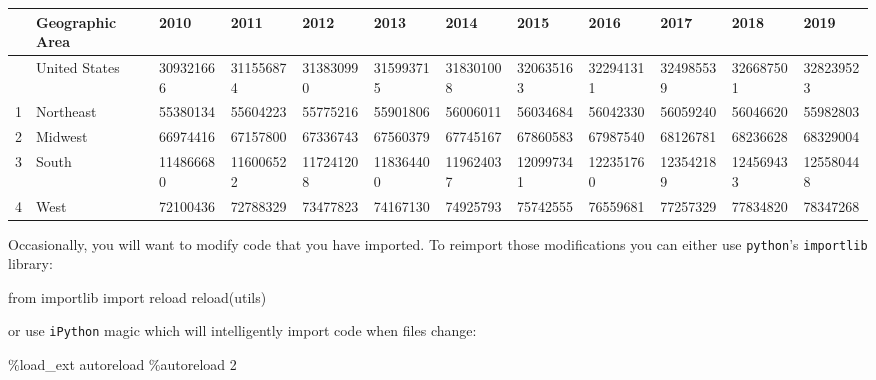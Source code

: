 \documentclass[
  letterpaper,
  DIV=11,
  numbers=noendperiod]{scrreprt}
\newenvironment{Shaded}{\begin{snugshade}}{\end{snugshade}}
\newcommand{\BuiltInTok}[1]{\textcolor[rgb]{0.00,0.23,0.31}{#1}}
\newcommand{\DecValTok}[1]{\textcolor[rgb]{0.68,0.00,0.00}{#1}}
\newcommand{\ImportTok}[1]{\textcolor[rgb]{0.00,0.46,0.62}{#1}}
\newcommand{\NormalTok}[1]{\textcolor[rgb]{0.00,0.23,0.31}{#1}}
\newcommand{\OperatorTok}[1]{\textcolor[rgb]{0.37,0.37,0.37}{#1}}
\begin{document}
\begin{longtable}[]{@{}llllllllllll@{}}
\toprule\noalign{}
& Geographic Area & 2010 & 2011 & 2012 & 2013 & 2014 & 2015 & 2016 &
2017 & 2018 & 2019 \\
\midrule\noalign{}
\endhead
\bottomrule\noalign{}
\endlastfoot
0 & United States & 309321666 & 311556874 & 313830990 & 315993715 &
318301008 & 320635163 & 322941311 & 324985539 & 326687501 & 328239523 \\
1 & Northeast & 55380134 & 55604223 & 55775216 & 55901806 & 56006011 &
56034684 & 56042330 & 56059240 & 56046620 & 55982803 \\
2 & Midwest & 66974416 & 67157800 & 67336743 & 67560379 & 67745167 &
67860583 & 67987540 & 68126781 & 68236628 & 68329004 \\
3 & South & 114866680 & 116006522 & 117241208 & 118364400 & 119624037 &
120997341 & 122351760 & 123542189 & 124569433 & 125580448 \\
4 & West & 72100436 & 72788329 & 73477823 & 74167130 & 74925793 &
75742555 & 76559681 & 77257329 & 77834820 & 78347268 \\
\end{longtable}

Occasionally, you will want to modify code that you have imported. To
reimport those modifications you can either use \texttt{python}'s
\texttt{importlib} library:

\begin{Shaded}
\begin{Highlighting}[]
\ImportTok{from}\NormalTok{ importlib }\ImportTok{import} \BuiltInTok{reload}
\BuiltInTok{reload}\NormalTok{(utils)}
\end{Highlighting}
\end{Shaded}

or use \texttt{iPython} magic which will intelligently import code when
files change:

\begin{Shaded}
\begin{Highlighting}[]
\OperatorTok{\%}\NormalTok{load\_ext autoreload}
\OperatorTok{\%}\NormalTok{autoreload }\DecValTok{2}
\end{Highlighting}
\end{Shaded}
\end{document}
